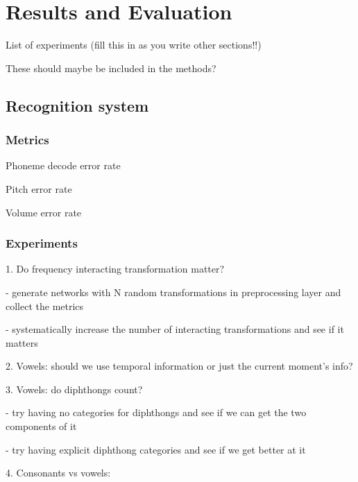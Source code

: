 \chapter{Results and Evaluation}



List of experiments (fill this in as you write other sections!!)

These should maybe be included in the methods?

\section{Recognition system}

\subsection{Metrics}

Phoneme decode error rate

Pitch error rate

Volume error rate

\subsection{Experiments}

1. Do frequency interacting transformation matter?

- generate networks with N random transformations
  in preprocessing layer and collect the metrics

- systematically increase the number of interacting
  transformations and see if it matters

2. Vowels: should we use temporal information or just
   the current moment's info?

3. Vowels: do diphthongs count?

- try having no categories for diphthongs and see if
  we can get the two components of it

- try having explicit diphthong categories and see
  if we get better at it

4. Consonants vs vowels:

